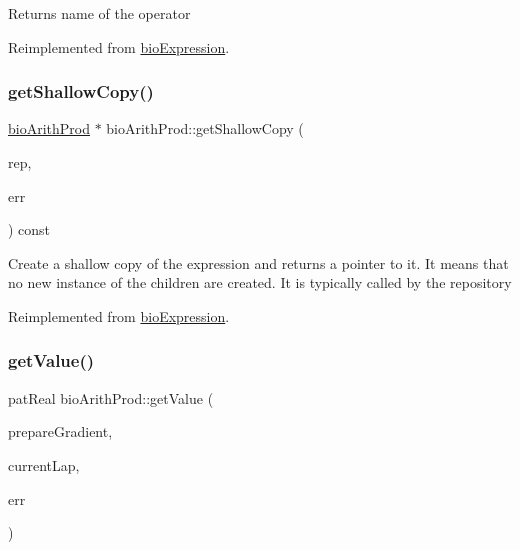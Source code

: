 \begin{DoxyReturn}{Returns}
name of the operator 
\end{DoxyReturn}


Reimplemented from \hyperlink{classbio_expression_a2353a4afb3a2b0af7c63aba086a72bde}{bio\+Expression}.

\mbox{\label{classbio_arith_prod_a8b4a3f836dc162ea067da896093c5f38}} 
\subsubsection{\texorpdfstring{get\+Shallow\+Copy()}{getShallowCopy()}}
{\footnotesize\ttfamily \hyperlink{classbio_arith_prod}{bio\+Arith\+Prod} $\ast$ bio\+Arith\+Prod\+::get\+Shallow\+Copy (\begin{DoxyParamCaption}\item[{\hyperlink{classbio_expression_repository}{bio\+Expression\+Repository} $\ast$}]{rep,  }\item[{pat\+Error $\ast$\&}]{err }\end{DoxyParamCaption}) const\hspace{0.3cm}{\ttfamily [virtual]}}

Create a shallow copy of the expression and returns a pointer to it. It means that no new instance of the children are created. It is typically called by the repository 

Reimplemented from \hyperlink{classbio_expression_a442534762693b92baaf33928979a1bf8}{bio\+Expression}.

\mbox{\label{classbio_arith_prod_a566bd383683dcd49930df1a1e5284918}} 
\subsubsection{\texorpdfstring{get\+Value()}{getValue()}}
{\footnotesize\ttfamily pat\+Real bio\+Arith\+Prod\+::get\+Value (\begin{DoxyParamCaption}\item[{pat\+Boolean}]{prepare\+Gradient,  }\item[{pat\+U\+Long}]{current\+Lap,  }\item[{pat\+Error $\ast$\&}]{err }\end{DoxyParamCaption})\hspace{0.3cm}{\ttfamily [virtual]}}

